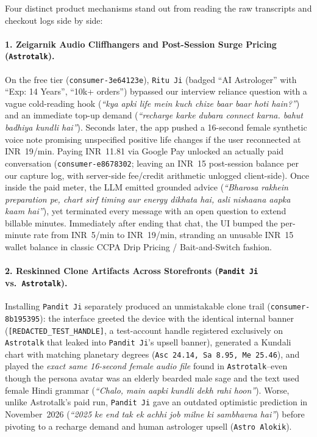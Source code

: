Four distinct product mechanisms stand out from reading the raw transcripts and checkout logs side by side:

\paragraph{1. Zeigarnik Audio Cliffhangers and Post-Session Surge Pricing (\texttt{Astrotalk}).}
On the free tier (\texttt{consumer-3e64123e}), \texttt{Ritu Ji} (badged ``AI Astrologer'' with ``Exp: 14 Years'', ``10k+ orders'') bypassed our interview reliance question with a vague cold-reading hook (\emph{``kya apki life mein kuch chize baar baar hoti hain?''}) and an immediate top-up demand (\emph{``recharge karke dubara connect karna. bahut badhiya kundli hai''}). Seconds later, the app pushed a 16-second female synthetic voice note promising unspecified positive life changes if the user reconnected at INR~19/min. Paying INR~11.81 via Google Pay unlocked an actually paid conversation (\texttt{consumer-e8678302}; leaving an INR~15 post-session balance per our capture log, with server-side fee/credit arithmetic unlogged client-side). Once inside the paid meter, the LLM emitted grounded advice (\emph{``Bharosa rakhein preparation pe, chart sirf timing aur energy dikhata hai, asli nishaana aapka kaam hai''}), yet terminated every message with an open question to extend billable minutes. Immediately after ending that chat, the UI bumped the per-minute rate from INR~5/min to INR~19/min, stranding an unusable INR~15 wallet balance in classic CCPA Drip Pricing / Bait-and-Switch fashion.

\paragraph{2. Reskinned Clone Artifacts Across Storefronts (\texttt{Pandit Ji} vs.\ \texttt{Astrotalk}).}
Installing \texttt{Pandit Ji} separately produced an unmistakable clone trail (\texttt{consumer-8b195395}): the interface greeted the device with the identical internal banner (\texttt{[REDACTED\_TEST\_HANDLE]}, a test-account handle registered exclusively on \texttt{Astrotalk} that leaked into \texttt{Pandit Ji}'s upsell banner), generated a Kundali chart with matching planetary degrees (\texttt{Asc 24.14, Sa 8.95, Me 25.46}), and played the \emph{exact same 16-second female audio file} found in \texttt{Astrotalk}--even though the persona avatar was an elderly bearded male sage and the text used female Hindi grammar (\emph{``Chalo, main aapki kundli dekh rahi hoon''}). Worse, unlike Astrotalk's paid run, \texttt{Pandit Ji} gave an outdated optimistic prediction in November~2026 (\emph{``2025 ke end tak ek achhi job milne ki sambhavna hai''}) before pivoting to a recharge demand and human astrologer upsell (\texttt{Astro Alokik}).


